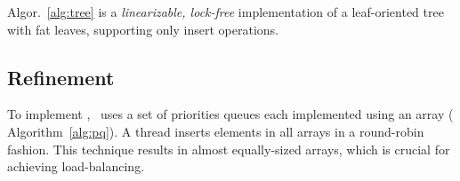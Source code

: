     \begin{lemma}
    \label{lem:tree}
    Algor.~\ref{alg:tree} is a {\em linearizable, lock-free} implementation of a leaf-oriented
    tree with fat leaves, supporting only insert operations.
    \end{lemma}

    \subsection{Refinement}

    To implement \RS, \Fresh\ uses a set of priorities queues
    each implemented using an array ( Algorithm~\ref{alg:pq}). 
    A thread inserts elements in all arrays in a round-robin fashion. 
    This technique results in almost equally-sized arrays, which is crucial
    for achieving load-balancing. 

    
